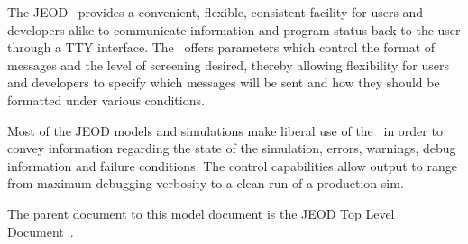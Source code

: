 The JEOD \MessageHandlerDesc\ provides a convenient, 
flexible, consistent facility for users and developers alike to
communicate information and program status back to the user through a TTY 
interface.  The \MessageHandlerDesc\ offers
parameters which control the format of messages and the level of screening desired, thereby 
allowing flexibility for users and developers to specify which messages will
be sent and how they should be formatted under various conditions.

Most of the JEOD models and simulations make liberal use of the \MessageHandlerDesc\ 
in order to convey information regarding the state of the simulation, 
errors, warnings, debug information 
and failure conditions.  The control capabilities allow output to 
range from maximum debugging verbosity to a clean run of a production sim.

The parent document to this model document is the
JEOD Top Level Document~\cite{dynenv:JEOD}.

